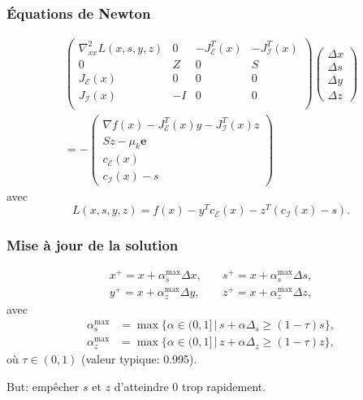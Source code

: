 \documentclass[usepdftitle=false]{beamer}
\def\cE{\mathcal{E}}
\def\cI{\mathcal{I}}
\def\be{\boldsymbol{e}}
\begin{document}
\begin{frame}
\frametitle{Équations de Newton}

\begin{multline*}
\begin{pmatrix}
\nabla^2_{xx} L(x,s,y,z) & 0 & - J^T_{\cE}(x) & - J^T_{\cI}(x) \\
0 & Z & 0 & S \\
J_{\cE}(x) & 0 & 0 & 0 \\
J_{\cI}(x) & -I & 0 & 0 \\
\end{pmatrix}
\begin{pmatrix}
\Delta x \\
\Delta s \\
\Delta y \\
\Delta z	
\end{pmatrix}
\\
= -\begin{pmatrix}
\nabla f(x) - J^T_{\cE}(x) y - J^T_{\cI} (x) z \\
Sz - \mu_k \be \\
c_{\cE}(x) \\
c_{\cI}(x)-s
\end{pmatrix}
\end{multline*}
avec
$$
L(x,s,y,z) = f(x) - y^Tc_{\cE}(x) - z^T\left( c_{\cI}(x) - s \right).
$$

\end{frame}

\begin{frame}
\frametitle{Mise à jour de la solution}

\begin{align*}
x^+ = x + \alpha_s^{\max} \Delta x,
&\quad
s^+ = x + \alpha_s^{\max} \Delta s, \\
y^+ = x + \alpha_z^{\max} \Delta y,
&\quad
z^+ = x + \alpha_z^{\max} \Delta z,
\end{align*}
avec
\begin{align*}
\alpha_s^{\max} &= \max \{ \alpha \in (0,1] \,|\, s + \alpha \Delta_s \geq (1-\tau)s \},\\
\alpha_z^{\max} &= \max \{ \alpha \in (0,1] \,|\, z + \alpha \Delta_z \geq (1-\tau)z \},
\end{align*}
où $\tau \in (0,1)$ (valeur typique: 0.995).

\mbox{}

But: empêcher $s$ et $z$ d'atteindre 0 trop rapidement.

\end{frame}
\end{document}
